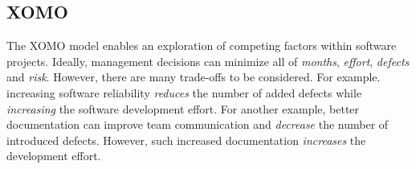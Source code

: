 \subsection{XOMO}\label{sec:xomo}


The XOMO model enables an exploration of competing factors 
within software projects. Ideally, management decisions can minimize
all of  {\em months}, {\em
  effort}, {\em defects} and {\em risk}. However, there are many trade-offs to be considered.
For
example.
increasing
software reliability   {\em reduces} the
  number of added defects while {\em increasing} the 
software development effort. For another example,
better documentation can improve team communication and {\em decrease} the number of introduced defects.
However, such increased documentation {\em increases} the development effort.

